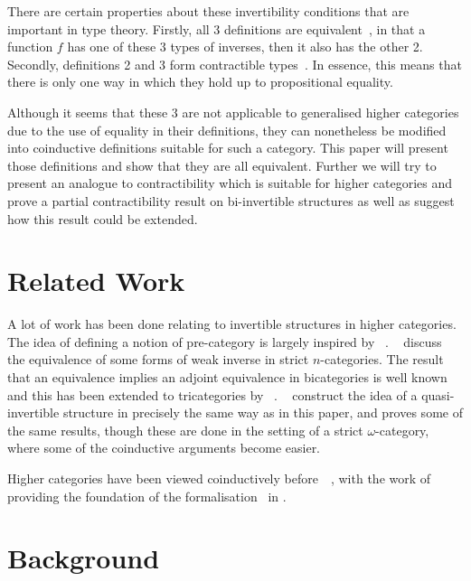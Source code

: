 \documentclass{article}
\theoremstyle{definition}
\theoremstyle{remark}
\begin{document}
There are certain properties about these invertibility conditions that are important in type theory. Firstly, all 3 definitions are equivalent~\cite[Corollary 4.3.3]{hottbook}, in that a function \(f\) has one of these 3 types of inverses, then it also has the other 2. Secondly, definitions 2 and 3 form contractible types~\cite[Theorem 4.2.13 ,Theorem 4.3.2]{hottbook}. In essence, this means that there is only one way in which they hold up to propositional equality.

Although it seems that these 3 are not applicable to generalised higher categories due to the use of equality in their definitions, they can nonetheless be modified into coinductive definitions suitable for such a category. This paper will present those definitions and show that they are all equivalent. Further we will try to present an analogue to contractibility which is suitable for higher categories and prove a partial contractibility result on bi-invertible structures as well as suggest how this result could be extended.

\section{Related Work}\label{sec:related}

A lot of work has been done relating to invertible structures in higher categories. The idea of defining a notion of pre-category is largely inspired by \citeauthor{Cheng2007}~\cite{Cheng2007}. \citeauthor{kansangian2009weak}~\cite{kansangian2009weak} discuss the equivalence of some forms of weak inverse in strict \(n\)-categories. The result that an equivalence implies an adjoint equivalence in bicategories is well known and this has been extended to tricategories by \citeauthor{gurski2012biequivalences}~\cite{gurski2012biequivalences}. \citeauthor*{lafont2010folk}~\cite{lafont2010folk} construct the idea of a quasi-invertible structure in precisely the same way as in this paper, and proves some of the same results, though these are done in the setting of a strict \(\omega\)-category, where some of the coinductive arguments become easier.

Higher categories have been viewed coinductively before~\cite{cheng2012weak}~\cite{hirschowitz_et_al:LIPIcs:2015:5166}, with the work of \citeauthor{hirschowitz_et_al:LIPIcs:2015:5166} providing the foundation of the formalisation~\cite{rice_agda} in .


\section{Background}\label{sec:background}
\end{document}
